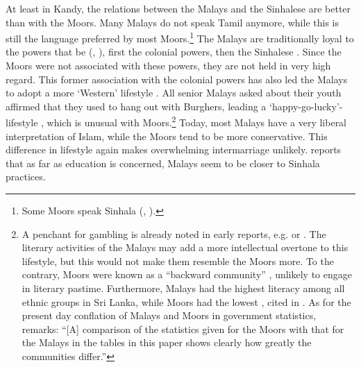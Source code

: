
At least in Kandy, the relations between the Malays and the Sinhalese are better than with the Moors. Many Malays do not speak Tamil anymore, while this is still the language preferred by most Moors.\footnote{Some Moors speak Sinhala (\citet[62]{Nuhman2007}, \citet[46]{Hussein2007}).} The Malays are traditionally loyal to the powers that be (\citet[52]{OsmanEtAl2008}, \citet[48]{Saldin2001}), first the colonial powers, then the Sinhalese \citep[cf.][35]{Bichsel}. Since the Moors were not associated with these powers, they are not held in very high regard. This former association with the colonial powers has also led the Malays to adopt a more `Western' lifestyle \citep[cf.][41]{Saldin2001}. All senior Malays asked about their youth affirmed that they used to hang out with Burghers, leading a `happy-go-lucky'-lifestyle \citep[27]{Hussainmiya1990}, which is unusual with Moors.\footnote{A penchant for gambling is already noted in early reports, e.g. \citet[106]{Schweitzer1931} or \citet[131]{Pieris1918}. The literary activities of the Malays may add a more intellectual overtone to this lifestyle, but this would not make them resemble the Moors more. To the contrary, Moors were known as a ``backward community''  \citep[95]{Hussainmiya1987}, unlikely to engage in literary pastime. Furthermore, Malays had the highest literacy among all ethnic groups in Sri Lanka, while Moors had the lowest \citep[48]{Marga1988}, cited in \citet[17]{Bichsel}. As for the present day conflation of Malays and Moors in government statistics, \citet[36]{Bichsel} remarks: ``[A] comparison of the statistics given for the Moors with that for the Malays in the tables in this paper shows clearly how greatly the communities differ.''} Today, most Malays have a very liberal interpretation of Islam, while the Moors tend to be more conservative. This difference in lifestyle again makes overwhelming intermarriage unlikely. \citet[35]{Saldin2003} reports that as far as education is concerned, Malays seem to be closer to Sinhala practices.

